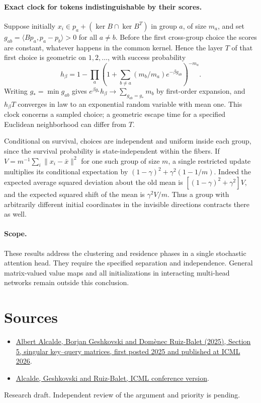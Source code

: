 \documentclass[10pt]{article}
\begin{document}
\paragraph{Exact clock for tokens indistinguishable by their scores.} Suppose initially $x_i\in p_a+(\ker B\cap\ker B^T)$ in group $a$, of size $m_a$, and set $g_{ab}=\langle Bp_a,p_a-p_b\rangle>0$ for all $a\ne b$. Before the first cross-group choice the scores are constant, whatever happens in the common kernel. Hence the layer $T$ of that first choice is geometric on $1,2,\ldots$, with success probability
\[
 h_\beta=1-\prod_a\left(1+\sum_{b\ne a}(m_b/m_a)e^{-\beta g_{ab}}\right)^{-m_a}.
\]
Writing $g_*=\min g_{ab}$ gives $e^{\beta g_*}h_\beta\to \sum_{g_{ab}=g_*}m_b$ by first-order expansion, and $h_\beta T$ converges in law to an exponential random variable with mean one. This clock concerns a sampled choice; a geometric escape time for a specified Euclidean neighborhood can differ from $T$.

Conditional on survival, choices are independent and uniform inside each group, since the survival probability is state-independent within the fibers. If $V=m^{-1}\sum_i\|x_i-\bar x\|^2$ for one such group of size $m$, a single restricted update multiplies its conditional expectation by
$(1-\gamma)^2+\gamma^2(1-1/m)$. Indeed the expected average squared deviation about the old mean is $[(1-\gamma)^2+\gamma^2]V$, and the expected squared shift of the mean is $\gamma^2 V/m$. Thus a group with arbitrarily different initial coordinates in the invisible directions contracts there as well.

\paragraph{Scope.} These results address the clustering and residence phases in a single stochastic attention head. They require the specified separation and independence. General matrix-valued value maps and all initializations in interacting multi-head networks remain outside this conclusion.

\section*{Sources}
\begin{itemize}
\item \href{https://arxiv.org/abs/2508.09628}{Albert Alcalde, Borjan Geshkovski and Domènec Ruiz-Balet (2025), Section 5, singular key--query matrices, first posted 2025 and published at ICML 2026}.
\item \href{https://proceedings.mlr.press/v306/alcalde26a.html}{Alcalde, Geshkovski and Ruiz-Balet, ICML conference version}.
\end{itemize}
{\small Research draft. Independent review of the argument and priority is pending.}
\end{document}
